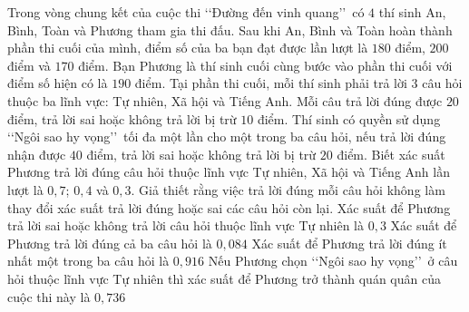\begin{ex}%
	Trong vòng chung kết của cuộc thi \lq\lq Đường đến vinh quang\rq\rq\ có $4$ thí sinh An, Bình, Toàn và Phương tham gia thi đấu. Sau khi An, Bình và Toàn hoàn thành phần thi cuối của mình, điểm số của ba bạn đạt được lần lượt là $180$ điểm, $200$ điểm và $170$ điểm. Bạn Phương là thí sinh cuối cùng bước vào phần thi cuối với điểm số hiện có là $190$ điểm. Tại phần thi cuối, mỗi thí sinh phải trả lời $3$ câu hỏi thuộc ba lĩnh vực: Tự nhiên, Xã hội và Tiếng Anh. Mỗi câu trả lời đúng được $20$ điểm, trả lời sai hoặc không trả lời bị trừ $10$ điểm. Thí sinh có quyền sử dụng \lq\lq Ngôi sao hy vọng\rq\rq\ tối đa một lần cho một trong ba câu hỏi, nếu trả lời đúng nhận được $40$ điểm, trả lời sai hoặc không trả lời bị trừ $20$ điểm. Biết xác suất Phương trả lời đúng câu hỏi thuộc lĩnh vực Tự nhiên, Xã hội và Tiếng Anh lần lượt là $0{,}7$; $0{,}4$ và $0{,}3$. Giả thiết rằng việc trả lời đúng mỗi câu hỏi không làm thay đổi xác suất trả lời đúng hoặc sai các câu hỏi còn lại. 
	\choiceTF
		{\True Xác suất để Phương trả lời sai hoặc không trả lời câu hỏi thuộc lĩnh vực Tự nhiên là $0{,}3$}
		{\True Xác suất để Phương trả lời đúng cả ba câu hỏi là $0{,}084$}
		{Xác suất để Phương trả lời đúng ít nhất một trong ba câu hỏi là $0{,}916$}
		{\True Nếu Phương chọn \lq\lq Ngôi sao hy vọng\rq\rq\ ở câu hỏi thuộc lĩnh vực Tự nhiên thì xác suất để Phương trở thành quán quân của cuộc thi này là $0{,}736$}
\end{ex}

